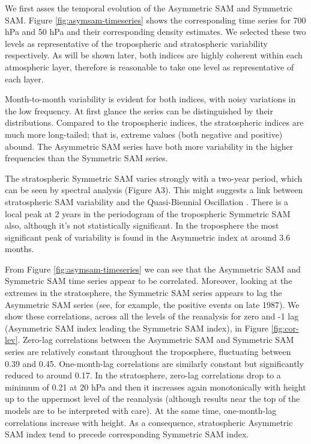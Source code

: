 \documentclass[]{ametsocV5}
\begin{document}
We first asses the temporal evolution of the Asymmetric SAM and
Symmetric SAM. Figure \ref{fig:asymsam-timeseries} shows the
corresponding time series for 700 hPa and 50 hPa and their corresponding
density estimates. We selected these two levels as representative of the
tropospheric and stratospheric variability respectively. As will be
shown later, both indices are highly coherent within each atmospheric
layer, therefore is reasonable to take one level as representative of
each layer.

Month-to-month variability is evident for both indices, with noisy
variations in the low frequency. At first glance the series can be
distinguished by their distributions. Compared to the tropospheric
indices, the stratospheric indices are much more long-tailed; that is,
extreme values (both negative and positive) abound. The Asymmetric SAM
series have both more variability in the higher frequencies than the
Symmetric SAM series.

The stratospheric Symmetric SAM varies strongly with a two-year period,
which can be seen by spectral analysis (Figure A3). This might suggests
a link between stratospheric SAM variability and the Quasi-Biennial
Oscillation \citep{baldwin2001b}. There is a local peak at 2 years in
the periodogram of the tropospheric Symmetric SAM also, although it's
not statistically significant. In the troposphere the most significant
peak of variability is found in the Asymmetric index at around 3.6
months.

From Figure \ref{fig:asymsam-timeseries} we can see that the Asymmetric
SAM and Symmetric SAM time series appear to be correlated. Moreover,
looking at the extremes in the stratosphere, the Symmetric SAM series
appears to lag the Asymmetric SAM series (see, for example, the positive
events on late 1987). We show these correlations, across all the levels
of the reanalysis for zero and -1 lag (Asymmetric SAM index leading the
Symmetric SAM index), in Figure \ref{fig:cor-lev}. Zero-lag correlations
between the Asymmetric SAM and Symmetric SAM series are relatively
constant throughout the troposphere, fluctuating between 0.39 and 0.45.
One-month-lag correlations are similarly constant but significantly
reduced to around 0.17. In the stratosphere, zero-lag correlations drop
to a minimum of 0.21 at 20 hPa and then it increases again monotonically
with height up to the uppermost level of the reanalysis (although
results near the top of the models are to be interpreted with care). At
the same time, one-month-lag correlations increase with height. As a
consequence, stratospheric Asymmetric SAM index tend to precede
corresponding Symmetric SAM index.
\end{document}
